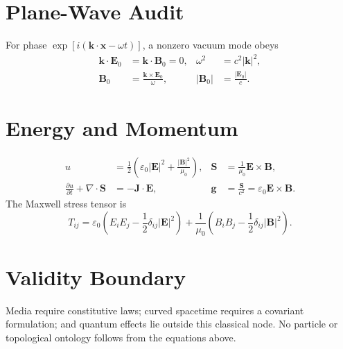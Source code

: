 \documentclass[11pt]{article}
\begin{document}
\section{Plane-Wave Audit}
For phase $\exp[i(\mathbf{k}\cdot\mathbf{x}-\omega t)]$, a nonzero vacuum mode obeys
\begin{align}
 \mathbf{k}\cdot\mathbf{E}_0&=\mathbf{k}\cdot\mathbf{B}_0=0, &
 \omega^2&=c^2|\mathbf{k}|^2,\\
 \mathbf{B}_0&=\frac{\mathbf{k}\times\mathbf{E}_0}{\omega}, &
 |\mathbf{B}_0|&=\frac{|\mathbf{E}_0|}{c}.
\end{align}

\section{Energy and Momentum}
\begin{align}
 u &= \frac{1}{2}\left(\varepsilon_0|\mathbf{E}|^2+
 \frac{|\mathbf{B}|^2}{\mu_0}\right), &
 \mathbf{S}&=\frac{1}{\mu_0}\mathbf{E}\times\mathbf{B},\\
 \frac{\partial u}{\partial t}+\nabla\cdot\mathbf{S}&=-\mathbf{J}\cdot\mathbf{E}, &
 \mathbf{g}&=\frac{\mathbf{S}}{c^2}=\varepsilon_0\mathbf{E}\times\mathbf{B}.
\end{align}
The Maxwell stress tensor is
\begin{equation}
 T_{ij}=\varepsilon_0\left(E_iE_j-\frac{1}{2}\delta_{ij}|\mathbf{E}|^2\right)
 +\frac{1}{\mu_0}\left(B_iB_j-\frac{1}{2}\delta_{ij}|\mathbf{B}|^2\right).
\end{equation}

\section{Validity Boundary}
Media require constitutive laws; curved spacetime requires a covariant formulation;
and quantum effects lie outside this classical node. No particle or topological ontology
follows from the equations above.



\end{document}
